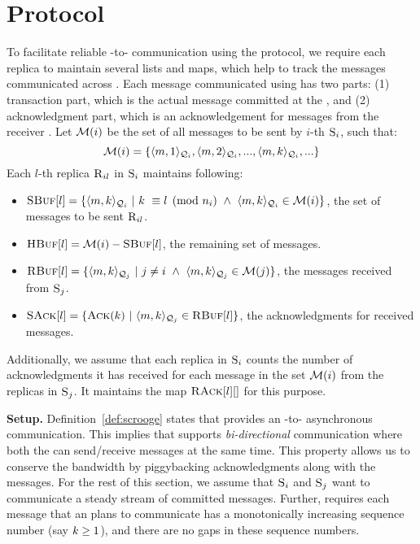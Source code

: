 \section{\Shadow{} Protocol}
\label{s:algo}
To facilitate reliable \RSM{}-to-\RSM{} communication using the \Scrooge{} protocol, 
we require each replica to maintain several lists and maps, which
help to track the messages communicated across .
Each message communicated using \Scrooge{} has two parts: 
(1) transaction part, which is the actual message committed at the \RSM{}, and 
(2) acknowledgment part, which is an acknowledgement for messages from the receiver \RSM{}. 
Let $\mathcal{M}(i)$ be the set of all messages to be sent by $i$-th \RSM{} $\textsc{S}_{i}$, such that:
\begin{equation*}
\mathcal{M}(i) = \{\langle m, 1\rangle_{\mathcal{Q}_{i}},  \langle m, 2\rangle_{\mathcal{Q}_{i}}, ... , \langle m, k\rangle_{\mathcal{Q}_{i}}, ... \} 
\end{equation*}
Each $l$-th replica $\textsc{R}_{{i}{l}}$ in \RSM{} $\textsc{S}_{i}$ maintains following:

\begin{itemize}[wide]
\item $\textsc{SBuf}[{l}] = \{\langle m, k\rangle_{\mathcal{Q}_{i}} ~|~ k ~\equiv l \pmod{n_i} ~\wedge ~\langle m, k\rangle_{\mathcal{Q}_{i}} \in \mathcal{M}(i) \}$, the set of messages to be sent $\textsc{R}_{{i}{l}}$.

\item $\textsc{HBuf}[{l}] = \mathcal{M}(i) - \textsc{SBuf}[{l}]$, the remaining set of messages.

\item $\textsc{RBuf}[{l}] = \{\langle m, k\rangle_{\mathcal{Q}_{j}} ~|~ j \neq i ~\wedge ~\langle m, k\rangle_{\mathcal{Q}_{j}} \in \mathcal{M}(j) \}$, the messages received from \RSM{} $\textsc{S}_{j}$.

\item $\textsc{SAck}[{l}] = \{\textsc{Ack}(k) ~|~ \langle m, k\rangle_{\mathcal{Q}_{j}} \in \textsc{RBuf}[{l}] \}$, the acknowledgments for received messages.

\end{itemize}
%
Additionally, we assume that each replica in \RSM{} $\textsc{S}_{i}$ 
counts the number of acknowledgments it has received for 
each message in the set $\mathcal{M}(i)$ from the replicas in \RSM{} $\textsc{S}_{j}$.
It maintains the map $\textsc{RAck}[{l}][{}]$ for this purpose. 


{\bf Setup.}
Definition~\ref{def:scrooge} states that \Scrooge{} provides an \RSM{}-to-\RSM{} asynchronous communication.
This implies that \Scrooge{} supports {\em bi-directional} communication where both the  can send/receive 
messages at the same time.
This property allows us to conserve the bandwidth by piggybacking acknowledgments along with the messages.
For the rest of this section, we assume that  $\textsc{S}_{i}$ and $\textsc{S}_{j}$ want to communicate a 
steady stream of committed messages.
Further, \Scrooge{} requires each message that an \RSM{} plans to communicate has 
a monotonically increasing sequence number (say $k \ge 1$), and there are no gaps in these sequence numbers.


